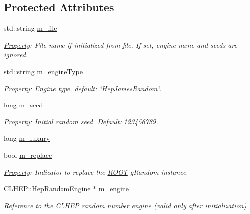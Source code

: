 \subsection*{Protected Attributes}
\begin{DoxyCompactItemize}
\item 
std\+::string \hyperlink{class_d_d4hep_1_1_simulation_1_1_geant4_random_a0392ac65cdbecdf7aa9663d919246d66}{m\+\_\+file}
\begin{DoxyCompactList}\small\item\em \hyperlink{class_d_d4hep_1_1_property}{Property}\+: File name if initialized from file. If set, engine name and seeds are ignored. \end{DoxyCompactList}\item 
std\+::string \hyperlink{class_d_d4hep_1_1_simulation_1_1_geant4_random_a288d4450519a05e0c2360c4994790cce}{m\+\_\+engine\+Type}
\begin{DoxyCompactList}\small\item\em \hyperlink{class_d_d4hep_1_1_property}{Property}\+: Engine type. default\+: \char`\"{}\+Hep\+James\+Random\char`\"{}. \end{DoxyCompactList}\item 
long \hyperlink{class_d_d4hep_1_1_simulation_1_1_geant4_random_a24193f5a0f19684a176f12a5aedec2b2}{m\+\_\+seed}
\begin{DoxyCompactList}\small\item\em \hyperlink{class_d_d4hep_1_1_property}{Property}\+: Initial random seed. Default\+: 123456789. \end{DoxyCompactList}\item 
long \hyperlink{class_d_d4hep_1_1_simulation_1_1_geant4_random_aa74af649720c65fd7e4e9d357e77c01d}{m\+\_\+luxury}
\item 
bool \hyperlink{class_d_d4hep_1_1_simulation_1_1_geant4_random_a3d14b4420a812cdb4e0965f77e3f5988}{m\+\_\+replace}
\begin{DoxyCompactList}\small\item\em \hyperlink{class_d_d4hep_1_1_property}{Property}\+: Indicator to replace the \hyperlink{namespace_r_o_o_t}{R\+O\+OT} g\+Random instance. \end{DoxyCompactList}\item 
C\+L\+H\+E\+P\+::\+Hep\+Random\+Engine $\ast$ \hyperlink{class_d_d4hep_1_1_simulation_1_1_geant4_random_aad17696c3d6d9f9953a40e75d8125da6}{m\+\_\+engine}
\begin{DoxyCompactList}\small\item\em Reference to the \hyperlink{namespace_c_l_h_e_p}{C\+L\+H\+EP} random number engine (valid only after initialization) \end{DoxyCompactList}\item 

\end{DoxyCompactItemize}
